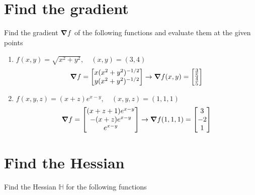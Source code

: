 \documentclass[12pt]{article}
\begin{document}
\section{Find the gradient}
Find the gradient $\grad f$ of the following functions and evaluate them at the given points
\begin{enumerate}
    \item $f(x,y) = \sqrt{x^2+y^2}, \quad (x,y)=(3,4)$
    \[ \grad f = \begin{bmatrix}
        x(x^2+y^2)^{-1/2} \\  y(x^2+y^2)^{-1/2}
    \end{bmatrix} \to \grad f (x,y) = \begin{bmatrix}
        \frac{3}{5} \\ \frac{4}{5}
    \end{bmatrix}\]
    \item $f(x,y,z) = (x+z)e^{x-y}, \quad (x,y,z)=(1,1,1)$
    \[ \grad f = \begin{bmatrix}
        (x+z+1)e^{x-y} \\ -(x+z)e^{x-y} \\ e^{x-y}
    \end{bmatrix} \to \grad f(1,1,1) = \begin{bmatrix}
        3 \\ -2 \\ 1    \end{bmatrix}\]
\end{enumerate}

\section{Find the Hessian}
Find the Hessian $\mathbb{H}$ for the following functions 
\end{document}
